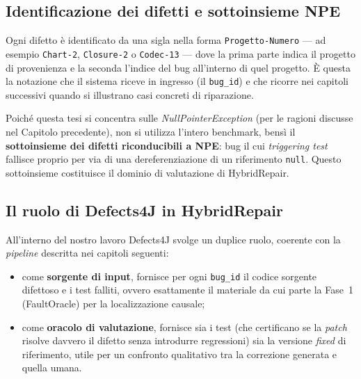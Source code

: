 \subsection{Identificazione dei difetti e sottoinsieme NPE}

Ogni difetto è identificato da una sigla nella forma \texttt{Progetto-Numero} --- ad esempio
\texttt{Chart-2}, \texttt{Closure-2} o \texttt{Codec-13} --- dove la prima parte indica il progetto di
provenienza e la seconda l'indice del bug all'interno di quel progetto. È questa la notazione che il
sistema riceve in ingresso (il \texttt{bug\_id}) e che ricorre nei capitoli successivi quando si
illustrano casi concreti di riparazione.

Poiché questa tesi si concentra sulle \textit{NullPointerException} (per le ragioni discusse nel
Capitolo precedente), non si utilizza l'intero benchmark, bensì il \textbf{sottoinsieme dei difetti
riconducibili a NPE}: bug il cui \textit{triggering test} fallisce proprio per via di una dereferenziazione
di un riferimento \texttt{null}. Questo sottoinsieme costituisce il dominio di valutazione di HybridRepair.

\subsection{Il ruolo di Defects4J in HybridRepair}

All'interno del nostro lavoro Defects4J svolge un duplice ruolo, coerente con la \textit{pipeline}
descritta nei capitoli seguenti:

\begin{itemize}
    \item come \textbf{sorgente di input}, fornisce per ogni \texttt{bug\_id} il codice sorgente
    difettoso e i test falliti, ovvero esattamente il materiale da cui parte la Fase~1 (FaultOracle)
    per la localizzazione causale;
    \item come \textbf{oracolo di valutazione}, fornisce sia i test (che certificano se la \textit{patch}
    risolve davvero il difetto senza introdurre regressioni) sia la versione \textit{fixed} di
    riferimento, utile per un confronto qualitativo tra la correzione generata e quella umana.
\end{itemize}

